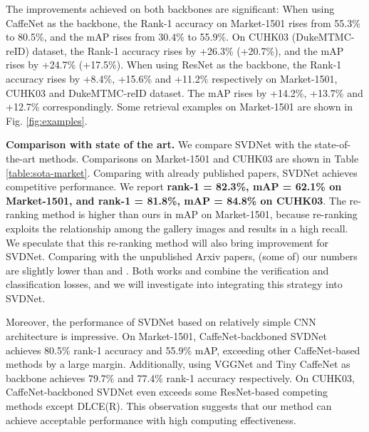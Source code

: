 \documentclass[10pt,twocolumn,letterpaper]{article}
\begin{document}

The improvements achieved on both backbones are significant: When using CaffeNet as the backbone, the Rank-1 accuracy on Market-1501 rises from 55.3\% to 80.5\%, and the mAP rises from 30.4\% to 55.9\%. On CUHK03 (DukeMTMC-reID) dataset, the Rank-1 accuracy rises by +26.3\% (+20.7\%), and the mAP rises by +24.7\% (+17.5\%). When using ResNet as the backbone, the Rank-1 accuracy rises by +8.4\%, +15.6\% and +11.2\% respectively on Market-1501, CUHK03 and DukeMTMC-reID dataset. The mAP rises by +14.2\%, +13.7\% and +12.7\% correspondingly. Some retrieval examples on Market-1501 are shown in Fig. \ref{fig:examples}.


\textbf{Comparison with state of the art.}
We compare SVDNet with the state-of-the-art methods. Comparisons on Market-1501 and CUHK03 are shown in Table \ref{table:sota-market}. Comparing with already published papers, SVDNet achieves competitive performance. We report \textbf{rank-1 = 82.3\%, mAP = 62.1\% on Market-1501, and rank-1 = 81.8\%, mAP = 84.8\% on CUHK03}. The re-ranking method \cite{DBLP:conf/cvpr/ZhongZCL17} is higher than ours in mAP on Market-1501, because re-ranking exploits the relationship among the gallery images and results in a high recall. We speculate that this re-ranking method will also bring improvement for SVDNet. Comparing with the unpublished Arxiv papers, (some of) our numbers are slightly lower than \cite{geng2016deep} and \cite{DBLP:journals/corr/ZhengZY16}. Both works \cite{geng2016deep} and \cite{DBLP:journals/corr/ZhengZY16} combine the verification and classification losses, and we will investigate into integrating this strategy into SVDNet.

Moreover, the performance of SVDNet based on relatively simple CNN architecture is impressive. On Market-1501, CaffeNet-backboned SVDNet achieves 80.5\% rank-1 accuracy and 55.9\% mAP, exceeding other CaffeNet-based methods by a large margin. Additionally, using VGGNet and Tiny CaffeNet as backbone achieves 79.7\% and 77.4\% rank-1 accuracy respectively. On CUHK03, CaffeNet-backboned SVDNet even exceeds some ResNet-based competing methods except DLCE(R). This observation suggests that our method can achieve acceptable performance with high computing effectiveness. 
\end{document}
